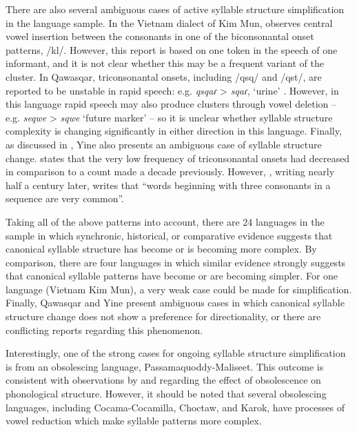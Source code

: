   There are also several ambiguous cases of active syllable structure simplification in the language sample. In the Vietnam dialect of Kim Mun, \citep[127]{Clark2008} observes central vowel insertion between the consonants in one of the biconsonantal onset patterns, /kl/. However, this report is based on one token in the speech of one informant, and it is not clear whether this may be a frequent variant of the cluster. In Qawasqar, triconsonantal onsets, including /qsq/ and /qst/, are reported to be unstable in rapid speech: e.g. \textit{qsqaɾ} > \textit{sqaɾ}, ‘urine’ \citep[393]{Clairis1985}. However, in this language rapid speech may also produce clusters through vowel deletion -- e.g. \textit{seqwe} > \textit{sqwe} ‘future marker’ -- so it is unclear whether syllable structure complexity is changing significantly in either direction in this language. Finally, as discussed in , Yine also presents an ambiguous case of syllable structure change. \citet[24]{Matteson1965} states that the very low frequency of triconsonantal onsets had decreased in comparison to a count made a decade previously. However, \citet[27]{Hanson2010}, writing nearly half a century later, writes that “words beginning with three consonants in a sequence are very common”.

  Taking all of the above patterns into account, there are 24 languages in the sample in which synchronic, historical, or comparative evidence suggests that canonical syllable structure has become or is becoming more complex. By comparison, there are four languages in which similar evidence strongly suggests that canonical syllable patterns have become or are becoming simpler. For one language (Vietnam Kim Mun), a very weak case could be made for simplification. Finally, Qawasqar and Yine present ambiguous cases in which canonical syllable structure change does not show a preference for directionality, or there are conflicting reports regarding this phenomenon.

  Interestingly, one of the strong cases for ongoing syllable structure simplification is from an obsolescing language, Passamaquoddy-Maliseet. This outcome is consistent with observations by \citet{Romaine2010} and \citet{Cook1989} regarding the effect of obsolescence on phonological structure. However, it should be noted that several obsolescing languages, including Cocama-Cocamilla, Choctaw, and Karok, have processes of vowel reduction which make syllable patterns more complex.

